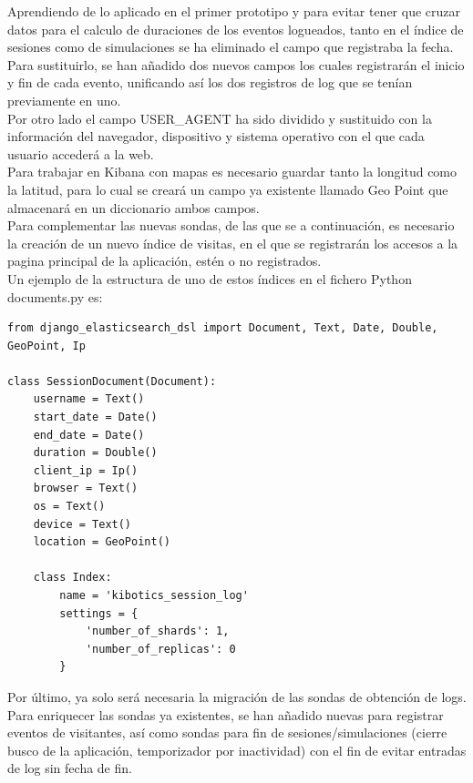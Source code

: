 \documentclass[11pt,a4paper]{book}
\begin{document}
				Aprendiendo de lo aplicado en el primer prototipo y para evitar tener que cruzar datos para el calculo de duraciones de los eventos logueados, tanto en el índice de sesiones como de simulaciones se ha eliminado el campo que registraba la fecha. Para sustituirlo, se han añadido dos nuevos campos los cuales registrarán el inicio y fin de cada evento, unificando así los dos registros de log que se tenían previamente en uno.\\
				
				Por otro lado el campo USER\_AGENT ha sido dividido y sustituido con la información del navegador, dispositivo y sistema operativo con el que cada usuario accederá a la web.\\
				
				Para trabajar en Kibana con mapas es necesario guardar tanto la longitud como la latitud, para lo cual se creará un campo ya existente llamado Geo Point que almacenará en un diccionario ambos campos.\\
								
				Para complementar las nuevas sondas, de las que se a continuación, es necesario la creación de un nuevo índice de visitas, en el que se registrarán los accesos a la pagina principal de la aplicación, estén o no registrados.\\
				
				Un ejemplo de la estructura de uno de estos índices en el fichero Python documents.py es:
				
				\begin{Verbatim}[tabsize=4]
from django_elasticsearch_dsl import Document, Text, Date, Double, GeoPoint, Ip
				
class SessionDocument(Document):
	username = Text()
	start_date = Date()
	end_date = Date()
	duration = Double()
	client_ip = Ip()
	browser = Text()
	os = Text()
	device = Text()
	location = GeoPoint()
	
	class Index:
		name = 'kibotics_session_log'
		settings = {
			'number_of_shards': 1,
			'number_of_replicas': 0
		}		
				\end{Verbatim}
				
					
				Por último, ya solo será necesaria la migración de las sondas de obtención de logs. Para enriquecer las sondas ya existentes, se han añadido nuevas para registrar eventos de visitantes, así como sondas para fin de sesiones/simulaciones (cierre busco de la aplicación, temporizador por inactividad) con el fin de evitar entradas de log sin fecha de fin.\\
				
\end{document}

